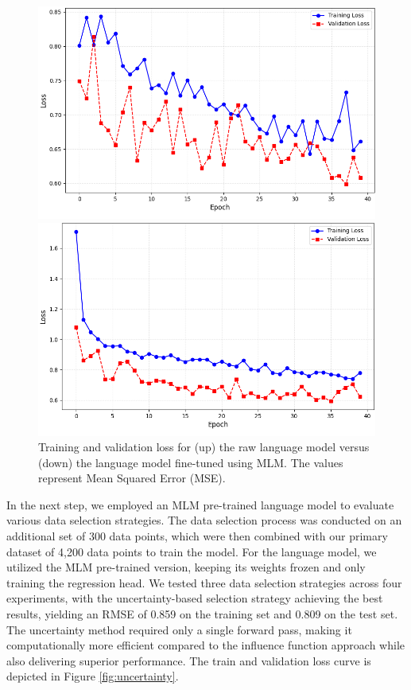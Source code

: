 \documentclass[11pt]{article}
\begin{document}
\begin{figure}[htbp]
    \centering
    \begin{minipage}{0.48\textwidth}
        \centering
        \includegraphics[width=\textwidth]{LM_RAW.png} %
    \end{minipage}
    \hfill
    \begin{minipage}{0.48\textwidth}
        \centering
        \includegraphics[width=\textwidth]{LM_MLM.png}  
    \end{minipage}
    \caption{Training and validation loss for (up) the raw language model versus (down) the language model fine-tuned using MLM. The values represent Mean Squared Error (MSE).} 
    \label{fig:Raw-vs-MLM} 
\end{figure}

In the next step, we employed an MLM pre-trained language model to evaluate various data selection strategies. The data selection process was conducted on an additional set of 300 data points, which were then combined with our primary dataset of 4,200 data points to train the model. For the language model, we utilized the MLM pre-trained version, keeping its weights frozen and only training the regression head. We tested three data selection strategies across four experiments, with the uncertainty-based selection strategy achieving the best results, yielding an RMSE of 0.859 on the training set and 0.809 on the test set. The uncertainty method required only a single forward pass, making it computationally more efficient compared to the influence function approach while also delivering superior performance. The train and validation loss curve is depicted in Figure \ref{fig:uncertainty}.  
\end{document}

